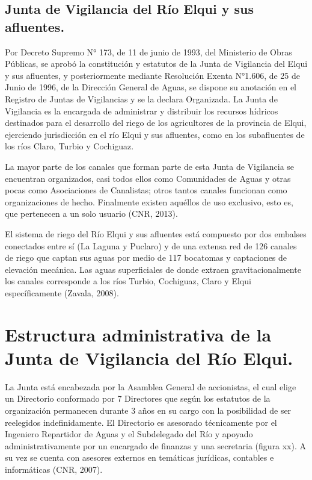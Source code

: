 \documentclass[10pt,]{article}
\begin{document}
\subsection{Junta de Vigilancia del Río Elqui y sus afluentes.}
Por Decreto Supremo N° 173, de 11 de junio de 1993, del Ministerio de Obras Públicas, se aprobó la constitución y estatutos de la Junta de Vigilancia del Elqui y sus afluentes, y posteriormente mediante Resolución Exenta N°1.606, de 25 de Junio de 1996, de la Dirección General de Aguas, se dispone su anotación en el Registro de Juntas de Vigilancias y se la declara Organizada. La Junta de Vigilancia es la encargada de administrar y distribuir los recursos hídricos destinados para el desarrollo del riego de los agricultores de la provincia de Elqui, ejerciendo jurisdicción en el río Elqui y sus afluentes, como en los subafluentes de los ríos Claro, Turbio y Cochiguaz.\bigskip 

La mayor parte de los canales que forman parte de esta Junta de Vigilancia se encuentran organizados, casi todos ellos como Comunidades de Aguas y otras pocas como Asociaciones de Canalistas; otros tantos canales funcionan como organizaciones de hecho. Finalmente existen aquéllos de uso exclusivo, esto es, que pertenecen a un solo usuario (CNR, 2013).\bigskip 

El sistema de riego del Río Elqui y sus afluentes está compuesto por dos embalses conectados entre sí (La Laguna y Puclaro) y de una extensa red de 126 canales de riego que captan sus aguas por medio de 117 bocatomas y captaciones de elevación mecánica. Las aguas superficiales de donde extraen gravitacionalmente los canales corresponde a los ríos Turbio, Cochiguaz, Claro y Elqui específicamente (Zavala, 2008).\bigskip 

\section{Estructura administrativa de la Junta de Vigilancia del Río Elqui.}
La Junta está encabezada por la Asamblea General de accionistas, el cual elige un Directorio conformado por 7 Directores que según los estatutos de la organización permanecen durante 3 años en su cargo con la posibilidad de ser reelegidos indefinidamente. El Directorio es asesorado técnicamente por el Ingeniero Repartidor de Aguas y el Subdelegado del Río y apoyado administrativamente por un encargado de finanzas y una secretaria (figura xx). A su vez se cuenta con asesores externos en temáticas jurídicas, contables e informáticas (CNR, 2007).
\end{document}
